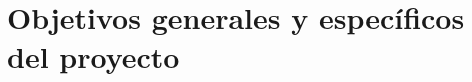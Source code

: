 \documentclass[
	12pt, %
	aspectratio=169, %
]{beamer}
\begin{document}


\section{Objetivos generales y específicos del proyecto}
\end{document}
